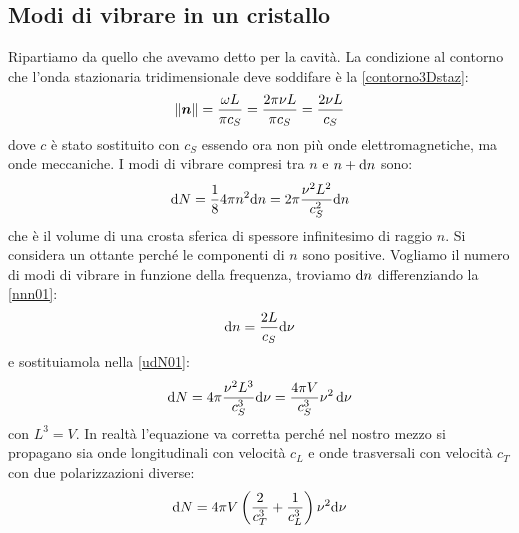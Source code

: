 \subsection{Modi di vibrare in un cristallo}
Ripartiamo da quello che avevamo detto per la cavità. La condizione al contorno che l'onda stazionaria tridimensionale deve soddifare è la \eqref{contorno3Dstaz}:
\begin{equation}
	\left\lVert\boldsymbol{n}\right\rVert=\frac{\omega L}{\pi c_S}=\frac{2\pi\nu L}{\pi c_S}=\frac{2\nu L}{c_S}
	\label{nnn01}
\end{equation}
dove $c$ è stato sostituito con $c_S$ essendo ora non più onde elettromagnetiche, ma onde meccaniche. I modi di vibrare compresi tra $n$ e $n+\mathrm{d} n$ sono:
\begin{equation}
	\mathrm{d} N=\frac{1}{8}4\pi n^2\mathrm{d} n=2\pi \frac{\nu^2 L^2}{c_S^2}\mathrm{d} n
	\label{udN01}
\end{equation}
che è il volume di una crosta sferica di spessore infinitesimo di raggio $n$. Si considera un ottante perché le componenti di $n$ sono positive. Vogliamo il numero di modi di vibrare in funzione della frequenza, troviamo $\mathrm{d} n$ differenziando la \eqref{nnn01}:
\begin{equation}
	\mathrm{d} n=\frac{2L}{c_S}\mathrm{d} \nu
\end{equation}
e sostituiamola nella \eqref{udN01}:
\begin{equation}
	\mathrm{d} N=4\pi \frac{\nu^2 L^3}{c_S^3}\mathrm{d} \nu=\frac{4\pi V}{c_S^3}\nu^2\,\mathrm{d} \nu
\end{equation}
con $L^3=V$. In realtà l'equazione va corretta perché nel nostro mezzo si propagano sia onde longitudinali con velocità $c_L$ e onde trasversali con velocità $c_T$ con due polarizzazioni diverse:
\begin{equation}
	\mathrm{d} N=4\pi V\left(\frac{2}{c_T^3}+\frac{1}{c_L^3}\right)\nu^2\mathrm{d} \nu
	\label{udn09}
\end{equation}
